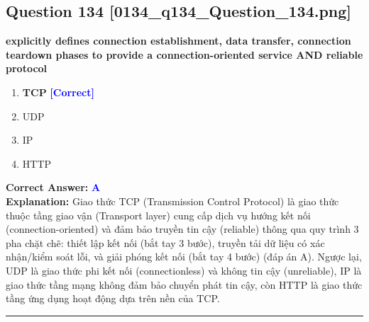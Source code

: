\documentclass[11pt,a4paper]{article}
\begin{document}
\begin{minipage}{\textwidth}
\subsection*{Question 134 \quad \footnotesize{[0134\_q134\_Question\_134.png]}}
\noindent \textbf{explicitly defines connection establishment, data transfer, connection teardown phases to provide a connection-oriented service AND reliable protocol}

\begin{enumerate}[label=\Alph*.]
    \item \textbf{TCP} \hfill \textcolor{blue}{\textbf{[Correct]}}
    \item UDP
    \item IP
    \item HTTP
\end{enumerate}

\noindent \textbf{Correct Answer:} \textcolor{blue}{\textbf{A}} \\[2pt]
\noindent \textbf{Explanation:} Giao thức TCP (Transmission Control Protocol) là giao thức thuộc tầng giao vận (Transport layer) cung cấp dịch vụ hướng kết nối (connection-oriented) và đảm bảo truyền tin cậy (reliable) thông qua quy trình 3 pha chặt chẽ: thiết lập kết nối (bắt tay 3 bước), truyền tải dữ liệu có xác nhận/kiểm soát lỗi, và giải phóng kết nối (bắt tay 4 bước) (đáp án A). Ngược lại, UDP là giao thức phi kết nối (connectionless) và không tin cậy (unreliable), IP là giao thức tầng mạng không đảm bảo chuyển phát tin cậy, còn HTTP là giao thức tầng ứng dụng hoạt động dựa trên nền của TCP.

\par\vspace{0.3cm}
\hrule
\vspace{0.3cm}
\end{minipage}
\end{document}
